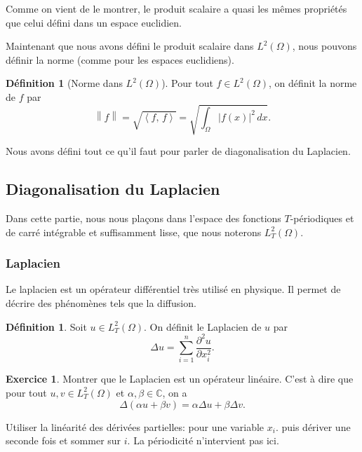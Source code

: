 \documentclass[11pt,a4paper]{article}
\numberwithin{equation}{section}
\theoremstyle{plain}
\theoremstyle{definition}
\newtheorem{definition}[theorem]{Définition}
\newtheorem{exercise}[theorem]{Exercice}
\theoremstyle{remark}
\newcommand{\C}{\mathbb{C}}
\newcommand{\norm}[1]{\left\lVert #1\right\rVert}
\newcommand{\ip}[2]{\left\langle #1,\, #2\right\rangle}
\newcommand{\Lap}{\Delta}
\begin{document}
Comme on vient de le montrer, le produit scalaire a quasi les mêmes propriétés que celui défini dans un espace euclidien.

Maintenant que nous avons défini le produit scalaire dans $L^2(\Omega)$, nous pouvons définir la norme (comme pour les espaces euclidiens).

\begin{definition}[Norme dans $L^2(\Omega)$]
Pour tout $f \in L^2(\Omega)$, on définit la norme de $f$ par
\[
    \norm{f} = \sqrt{\ip{f}{f}} = \sqrt{\int_\Omega |f(x)|^2 \, dx}.
\]
\end{definition}

Nous avons défini tout ce qu'il faut pour parler de diagonalisation du Laplacien.

\subsection{Diagonalisation du Laplacien}

Dans cette partie, nous nous plaçons dans l'espace des fonctions $T$-périodiques et de carré intégrable et suffisamment lisse, que nous noterons $L^2_T(\Omega)$.

\subsubsection{Laplacien}

Le laplacien est un opérateur différentiel très utilisé en physique. Il permet de décrire des phénomènes tels que la diffusion.

\begin{definition}
    Soit $u \in L^2_T(\Omega)$. On définit le Laplacien de $u$ par
    \[
        \Lap u = \sum_{i=1}^n \frac{\partial^2 u}{\partial x_i^2}.
    \]
\end{definition}

\begin{exercise}
    Montrer que le Laplacien est un opérateur linéaire.
    C'est à dire que pour tout $u,v \in L^2_T(\Omega)$ et $\alpha,\beta \in \C$, on a
    \[
        \Lap(\alpha u + \beta v) = \alpha \Lap u + \beta \Lap v.
    \]
\end{exercise}

\begin{indication}
    Utiliser la linéarité des dérivées partielles: pour une variable $x_i$.
    puis dériver une seconde fois et sommer sur $i$.
    La périodicité n'intervient pas ici.
\end{indication}
\end{document}

